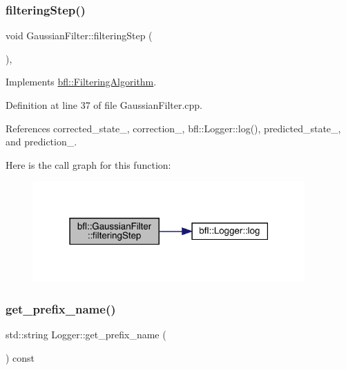 \subsubsection{\texorpdfstring{filtering\+Step()}{filteringStep()}}
{\footnotesize\ttfamily void Gaussian\+Filter\+::filtering\+Step (\begin{DoxyParamCaption}{ }\end{DoxyParamCaption})\hspace{0.3cm}{\ttfamily [override]}, {\ttfamily [virtual]}}



Implements \mbox{\hyperlink{classbfl_1_1FilteringAlgorithm_ab3bceb43b5810a4bf1da884b8a0b145a}{bfl\+::\+Filtering\+Algorithm}}.



Definition at line 37 of file Gaussian\+Filter.\+cpp.



References corrected\+\_\+state\+\_\+, correction\+\_\+, bfl\+::\+Logger\+::log(), predicted\+\_\+state\+\_\+, and prediction\+\_\+.

Here is the call graph for this function\+:
\nopagebreak
\begin{figure}[H]
\begin{center}
\leavevmode
\includegraphics[width=295pt]{classbfl_1_1GaussianFilter_ae30a175454a93685eca79d3ef857f7bc_cgraph}
\end{center}
\end{figure}
\mbox{\label{classbfl_1_1Logger_a913a795b7bfbf378815eeb342d68a7c0}} 
\subsubsection{\texorpdfstring{get\+\_\+prefix\+\_\+name()}{get\_prefix\_name()}}
{\footnotesize\ttfamily std\+::string Logger\+::get\+\_\+prefix\+\_\+name (\begin{DoxyParamCaption}{ }\end{DoxyParamCaption}) const\hspace{0.3cm}{\ttfamily [inherited]}}




